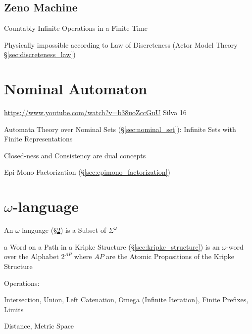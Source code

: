 \subsection{Zeno Machine}\label{sec:zeno_machine}

Countably Infinite Operations in a Finite Time

\fist Physically impossible according to Law of Discreteness (Actor
Model Theory \S\ref{sec:discreteness_law})



\section{Nominal Automaton}\label{sec:nominal_automaton}

\url{https://www.youtube.com/watch?v=b38uoZccGuU} Silva 16

Automata Theory over Nominal Sets (\S\ref{sec:nominal_set}): Infinite
Sets with Finite Representations

Closed-ness and Consistency are dual concepts

Epi-Mono Factorization (\S\ref{sec:epimono_factorization})



\section{$\omega$-language}\label{sec:omega_language}

An $\omega$-language (\S\ref{sec:omega_language}) is a Subset of
$\Sigma^\omega$

a Word on a Path in a Kripke Structure (\S\ref{sec:kripke_structure})
is an $\omega$-word over the Alphabet $2^{AP}$ where $AP$ are the
Atomic Propositions of the Kripke Structure

Operations:

Intersection, Union, Left Catenation, Omega (Infinite Iteration),
Finite Prefixes, Limits

Distance, Metric Space %



